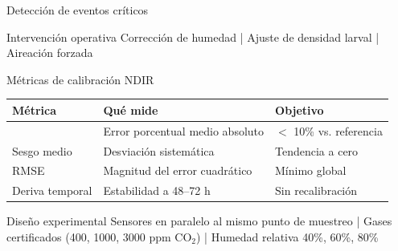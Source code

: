 \documentclass[aspectratio=169, 11pt]{beamer}
\newcommand{\MAPE}{\text{MAPE}}
\begin{document}
\begin{frame}{Detecci\'{o}n de eventos cr\'{i}ticos}
    \begin{center}
    \end{center}

    \vfill
    \begin{block}{Intervenci\'{o}n operativa}
        \centering
        Correcci\'{o}n de humedad | Ajuste de densidad larval | Aireaci\'{o}n forzada
    \end{block}
\end{frame}

\begin{frame}{M\'{e}tricas de calibraci\'{o}n NDIR}
    \begin{center}
        \begin{tabular}{lll}
            \toprule
            \textbf{M\'{e}trica} & \textbf{Qu\'{e} mide} & \textbf{Objetivo} \\
            \midrule
            \MAPE{} & Error porcentual medio absoluto & $<$ 10\% vs. referencia \\
            Sesgo medio & Desviaci\'{o}n sistem\'{a}tica & Tendencia a cero \\
            RMSE & Magnitud del error cuadr\'{a}tico & M\'{i}nimo global \\
            Deriva temporal & Estabilidad a 48--72 h & Sin recalibraci\'{o}n \\
            \bottomrule
        \end{tabular}
    \end{center}

    \vfill
    \begin{alertblock}{Dise\~{n}o experimental}
        \centering
        Sensores en paralelo al mismo punto de muestreo | Gases certificados (400, 1000, 3000 ppm CO$_2$) | Humedad relativa 40\%, 60\%, 80\%
    \end{alertblock}
\end{frame}
\end{document}
